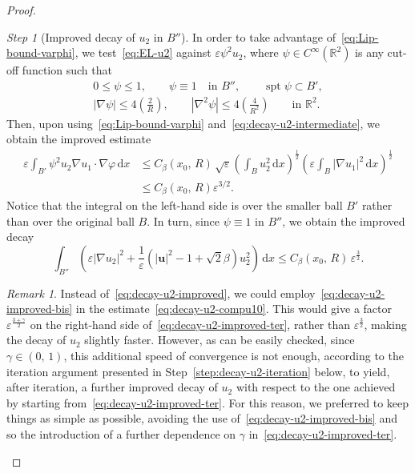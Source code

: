 \documentclass[a4paper, 11pt, twoside, leqno]{article}
\theoremstyle{definition}              %
\theoremstyle{remark}                  %
\newtheorem{step}{Step}
\newtheorem{remark}{Remark}
\DeclareMathOperator{\spt}{spt}                                     %
\newcommand{\abs}[1]{\left| #1 \right|}                             %
\renewcommand{\d}{\mathrm{d}}
\newcommand{\R}{\mathbb{R}}
\renewcommand{\u}{\mathbf{u}}
\newcommand{\eps}{\varepsilon}
\begin{document}
\begin{proof}
\begin{step}[Improved decay of $u_2$ in $B''$]\label{step:u2-improved-decay}
    In order to take advantage 
    of~\eqref{eq:Lip-bound-varphi}, we test~\eqref{eq:EL-u2} against 
    $\eps \psi^2 u_2$, where $\psi \in C^\infty(\R^2)$ is any cut-off function such that
    \begin{gather*}
        0 \leq \psi \leq 1, \qquad 
        \psi \equiv 1 \quad \mbox{in } B'', \qquad 
        \spt\psi \subset B', \\ 
        \abs{\nabla \psi} \leq 4\left(\frac{2}{R}\right), \qquad \abs{\nabla^2 \psi} \leq 4\left(\frac{4}{R^2}\right) \qquad \mbox{in } \R^2. 
    \end{gather*}
    Then, upon using~\eqref{eq:Lip-bound-varphi} and~\eqref{eq:decay-u2-intermediate}, 
    we obtain the improved estimate
    \begin{equation}\label{eq:decay-u2-compu10}
    \begin{split}
       \eps \int_{B'} \psi^2 u_2 \nabla u_1 \cdot \nabla \varphi \,{\d}x &\leq C_\beta(x_0,\,R)\,\sqrt{\eps}\left( \int_B u_2^2 \,{\d}x \right)^{\frac{1}{2}} \left( \eps \int_B \abs{\nabla u_1}^2 \,{\d}x\right)^{\frac{1}{2}} \\
       &\leq C_\beta(x_0,\,R) \eps^{3/2}.
    \end{split}   
    \end{equation}
    Notice that the integral on the left-hand side is over the smaller 
    ball $B'$ rather than over the original ball $B$.
    In turn, since $\psi \equiv 1$ in $B''$, we obtain the improved decay 
    \begin{equation}\label{eq:decay-u2-improved-ter}
        \int_{B''} \left( \eps \abs{\nabla u_2}^2 + \frac{1}{\eps}\left( \abs{\u}^2 - 1 + \sqrt{2}\beta \right) u_2^2 \right)\,{\d}x 
        \leq C_\beta(x_0,\,R) \, \eps^\frac{3}{2}.
    \end{equation}

    \begin{remark}
        Instead of~\eqref{eq:decay-u2-improved}, we could employ~\eqref{eq:decay-u2-improved-bis} in the estimate~\eqref{eq:decay-u2-compu10}. This would give a factor $\eps^\frac{3+\gamma}{2}$ on the right-hand side of~\eqref{eq:decay-u2-improved-ter}, rather than $\eps^\frac{3}{2}$, making the decay of $u_2$ slightly faster. However, as can be easily checked, since $\gamma \in (0,\,1)$, this additional speed of convergence is not enough, according to the iteration argument presented in Step~\ref{step:decay-u2-iteration} below, to yield, after iteration, a further improved decay of $u_2$ with respect to the one achieved by starting from~\eqref{eq:decay-u2-improved-ter}. For this reason, we preferred to keep things as simple as possible, avoiding the use of~\eqref{eq:decay-u2-improved-bis} and so the introduction of a further dependence on $\gamma$ in~\eqref{eq:decay-u2-improved-ter}.
    \end{remark}
\end{step}


\end{proof}
\end{document}
